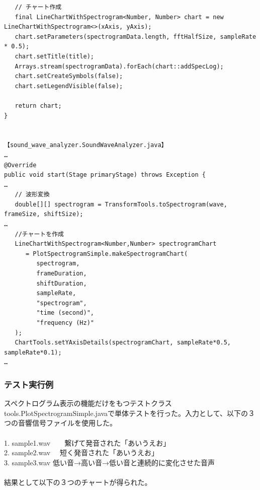 \documentclass[a4j]{jarticle}
\begin{document}
\begin{verbatim}
   // チャート作成
   final LineChartWithSpectrogram<Number, Number> chart = new LineChartWithSpectrogram<>(xAxis, yAxis);
   chart.setParameters(spectrogramData.length, fftHalfSize, sampleRate * 0.5);
   chart.setTitle(title);
   Arrays.stream(spectrogramData).forEach(chart::addSpecLog);
   chart.setCreateSymbols(false);
   chart.setLegendVisible(false);
		
   return chart;
}


【sound_wave_analyzer.SoundWaveAnalyzer.java】
…
@Override
public void start(Stage primaryStage) throws Exception {
…
   // 波形変換
   double[][] spectrogram = TransformTools.toSpectrogram(wave, frameSize, shiftSize);
…
   //チャートを作成
   LineChartWithSpectrogram<Number,Number> spectrogramChart 
      = PlotSpectrogramSimple.makeSpectrogramChart(
         spectrogram, 
         frameDuration, 
         shiftDuration, 
         sampleRate, 
         "spectrogram", 
         "time (second)",
         "frequency (Hz)"
   );
   ChartTools.setYAxisDetails(spectrogramChart, sampleRate*0.5, sampleRate*0.1);
…
\end{verbatim}
\subsubsection{テスト実行例}

スペクトログラム表示の機能だけをもつテストクラスtools.PlotSpectrogramSimple.javaで単体テストを行った。入力として、以下の３つの音響信号ファイルを使用した。\\
　\\
1. sample1.wav　　繋げて発音された「あいうえお」\\
2. sample2.wav　  短く発音された「あいうえお」\\
3. sample3.wav    低い音→高い音→低い音と連続的に変化させた音声\\
　\\
結果として以下の３つのチャートが得られた。
\end{document}
